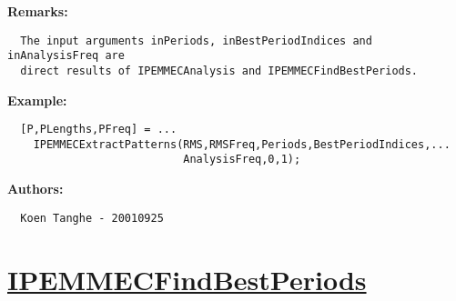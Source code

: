 \textbf{Remarks:}
\begin{verbatim}  The input arguments inPeriods, inBestPeriodIndices and inAnalysisFreq are
  direct results of IPEMMECAnalysis and IPEMMECFindBestPeriods.

\end{verbatim}
\textbf{Example:}
\begin{verbatim}  [P,PLengths,PFreq] = ...
    IPEMMECExtractPatterns(RMS,RMSFreq,Periods,BestPeriodIndices,...
                           AnalysisFreq,0,1);

\end{verbatim}
\textbf{Authors:}
\begin{verbatim}  Koen Tanghe - 20010925
\end{verbatim}


\newpage
\section*{\hyperlink{Concepts:IPEMMECFindBestPeriods}{IPEMMECFindBestPeriods}}
\hypertarget{FuncRef:IPEMMECFindBestPeriods}{}

